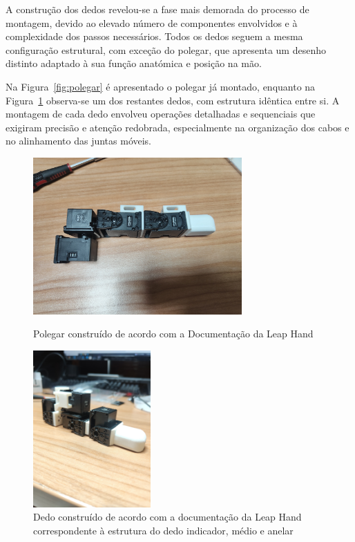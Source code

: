 A construção dos dedos revelou-se a fase mais demorada do processo de montagem, devido ao elevado número de componentes envolvidos e à complexidade dos passos necessários. Todos os dedos seguem a mesma configuração estrutural, com exceção do polegar, que apresenta um desenho distinto adaptado à sua função anatómica e posição na mão.

Na Figura~\ref{fig:polegar} é apresentado o polegar já montado, enquanto na Figura~\ref{fig:dedo} observa-se um dos restantes dedos, com estrutura idêntica entre si. A montagem de cada dedo envolveu operações detalhadas e sequenciais que exigiram precisão e atenção redobrada, especialmente na organização dos cabos e no alinhamento das juntas móveis.

\begin{figure}[H]
    \centering
    \begin{minipage}[b]{0.45\textwidth}
        \centering
        \includegraphics[height=6cm]{figs/chapter4/polegar.jpg}
        \caption{Polegar construído de acordo com a Documentação da Leap Hand}
        \label{fig:polegar}
    \end{minipage}
    \hfill
    \begin{minipage}[b]{0.45\textwidth}
        \centering
        \includegraphics[height=6cm]{figs/chapter4/dedo.jpg}
        \caption{Dedo construído de acordo com a documentação da Leap Hand correspondente à estrutura do dedo indicador, médio e anelar}
        \label{fig:dedo}
    \end{minipage}
\end{figure}

